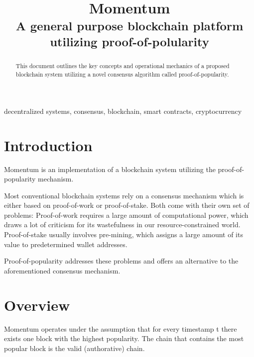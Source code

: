 \documentclass[conference]{IEEEtran}
\begin{document}
\title{Momentum\\
{\footnotesize \textsuperscript{A general purpose blockchain platform utilizing proof-of-polularity}}
}

\author{
}

\maketitle

\begin{abstract}
This document outlines the key concepts and operational mechanics of a proposed blockchain
system utilizing a novel consensus algorithm called proof-of-popularity.
\end{abstract}

\begin{IEEEkeywords}
decentralized systems, consensus, blockchain, smart contracts, cryptocurrency
\end{IEEEkeywords}

\section{Introduction}
Momentum is an implementation of a blockchain system utilizing the proof-of-popularity mechanism.

Most conventional blockchain systems rely on a consensus mechanism which is either based on proof-of-work
or proof-of-stake. Both come with their own set of problems: Proof-of-work requires a large amount of computational power,
which draws a lot of criticism for its wastefulness in our resource-constrained world. Proof-of-stake
usually involves pre-mining, which assigns a large amount of its value to predetermined wallet addresses.

Proof-of-popularity addresses these problems and offers an alternative to the aforementioned consensus mechanism.

\section{Overview}
Momentum operates under the assumption that for every timestamp t there exists one block with the highest popularity.
The chain that contains the most popular block is the valid (authorative) chain.
\end{document}
